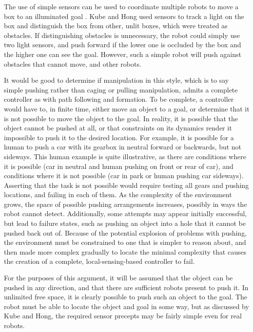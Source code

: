 The use of simple sensors can be used to coordinate multiple robots to move a box to an illuminated goal \citep{kube1996use}. 
Kube and Hong used sensors to track a light on the box and distinguish the box from other, unlit boxes, which were treated as obstacles. 
If distinguishing obstacles is unnecessary, the robot could simply use two light sensors, and push forward if the lower one is occluded by the box and the higher one can see the goal. 
However, such a simple robot will push against obstacles that cannot move, and other robots. 

It would be good to determine if manipulation in this style, which is to say simple pushing rather than caging or pulling manipulation, admits a complete controller as with path following and formation. 
To be complete, a controller would have to, in finite time, either move an object to a goal, or determine that it is not possible to move the object to the goal. 
In reality, it is possible that the object cannot be pushed at all, or that constraints on its dynamics render it impossible to push it to the desired location. 
For example, it is possible for a human to push a car with its gearbox in neutral forward or backwards, but not sideways. 
This human example is quite illustrative, as there are conditions where it is possible (car in neutral and human pushing on front or rear of car), and conditions where it is not possible (car in park or human pushing car sideways). 
Asserting that the task is not possible would require testing all gears and pushing locations, and failing in each of them. 
As the complexity of the environment grows, the space of possible pushing arrangements increases, possibly in ways the robot cannot detect. 
Additionally, some attempts may appear initially successful, but lead to failure states, such as pushing an object into a hole that it cannot be pushed back out of. 
Because of the potential explosion of problems with pushing, the environment must be constrained to one that is simpler to reason about, and then made more complex gradually to locate the minimal complexity that causes the creation of a complete, local-sensing-based controller to fail.

For the purposes of this argument, it will be assumed that the object can be pushed in any direction, and that there are sufficient robots present to push it. 
In unlimited free space, it is clearly possible to push such an object to the goal.
The robot must be able to locate the object and goal in some way, but as discussed by Kube and Hong, the required sensor precepts may be fairly simple even for real robots. 

